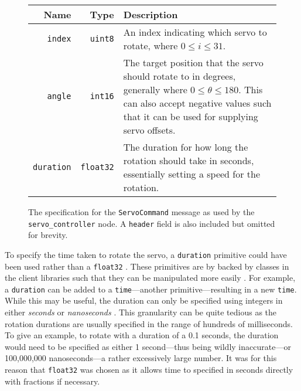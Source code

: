 \begin{figure}[!h]
	\centering
	\begin{tabular}{ r r p{10cm} }
		\toprule
		\textbf{Name} & 
		\textbf{Type} & 
		\textbf{Description} \\
		\midrule

		\texttt{index} & 
		\texttt{uint8} &
		An index indicating which servo to rotate, where $0 \leq i \leq 31$. \\
		
		\hline

		\texttt{angle} & 
		\texttt{int16} & 
		The target position that the servo should rotate to in degrees, generally where $0 \leq \theta \leq 180$. This can also accept negative values such that it can be used for supplying servo offsets. \\
		
		\hline

		\texttt{duration} &
		\texttt{float32} &
		The duration for how long the rotation should take in seconds, essentially setting a speed for the rotation. \\
		\bottomrule
	\end{tabular}
	\caption{The specification for the \texttt{ServoCommand} message as used by the \texttt{servo\_controller} node. A \texttt{header} field is also included but omitted for brevity.}
	\label{fig:servocommand_msg}
\end{figure}

To specify the time taken to rotate the servo, a \texttt{duration} primitive could have been used rather than a \texttt{float32} \cite{ros_wiki_msg}. These primitives are by backed by classes in the client libraries such that they can be manipulated more easily \cite{ros_api_duration_msg}. For example, a \texttt{duration} can be added to a \texttt{time}---another primitive---resulting in a new \texttt{time}. While this may be useful, the duration can only be specified using integers in either \emph{seconds} or \emph{nanoseconds} \cite{ros_api_duration_msg}. This granularity can be quite tedious as the rotation durations are usually specified in the range of hundreds of milliseconds. To give an example, to rotate with a duration of a 0.1 seconds, the duration would need to be specified as either 1 second---thus being wildly inaccurate---or 100,000,000 nanoseconds---a rather excessively large number. It was for this reason that \texttt{float32} was chosen as it allows time to specified in seconds directly with fractions if necessary.

